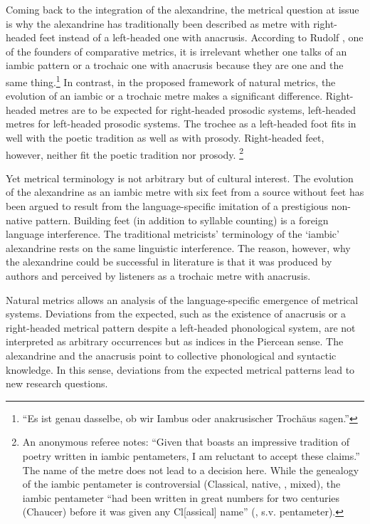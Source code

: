 \documentclass[output=paper
  ,nobabel
  ,uniformtopskip %
]{langscibook}
\begin{document}
Coming back to the integration of the  alexandrine, the metrical question at issue is why the  alexandrine has traditionally been described as metre with right-headed feet instead of a left-headed one with anacrusis. According to Rudolf \citet[154]{Westphal1892}, one of the founders of comparative metrics, it is irrelevant whether one talks of an iambic pattern or a trochaic one with anacrusis because they are one and the same thing.\footnote{
\hspace{1pt}``Es ist genau dasselbe, ob wir Iambus oder anakrusischer Trochäus sagen.''} In contrast, in the proposed framework of natural metrics, the evolution of an iambic or a trochaic metre makes a significant difference. Right-headed metres are to be expected for right-headed prosodic systems, left-headed metres for left-headed prosodic systems. The trochee as a left-headed foot fits in well with the  poetic tradition as well as with  prosody. Right-headed feet, however, neither fit the  poetic tradition nor  prosody.%
%
\footnote{An anonymous referee notes: ``Given that  boasts an impressive tradition of poetry written in iambic pentameters, I am reluctant to accept these claims.'' The name of the  metre does not lead to a decision here. While the genealogy of the  iambic pentameter is controversial (Classical, native, , mixed), the  iambic pentameter ``had been written in great numbers for two centuries (Chaucer) before it was given any Cl[assical] name'' (\citealt{Encyclopedia1993}, s.v. pentameter).} 

Yet metrical terminology is not arbitrary but of cultural interest. The evolution of the  alexandrine as an iambic metre with six feet from a  source without feet has been argued to result from the language-specific imitation of a prestigious non-native pattern. Building feet (in addition to syllable counting) is a foreign language interference. The traditional metricists' terminology of the `iambic' alexandrine rests on the same linguistic interference. The reason, however, why the alexandrine could be successful in  literature is that it was produced by  authors and perceived by  listeners as a trochaic metre with anacrusis.

Natural metrics allows an analysis of the language-specific emergence of metrical systems. Deviations from the expected, such as the existence of anacrusis or a right-headed metrical pattern despite a left-headed phonological system, are not interpreted as arbitrary occurrences but as indices in the Piercean sense. The  alexandrine and the  anacrusis point to collective phonological and syntactic knowledge. In this sense, deviations from the expected metrical patterns lead to new research questions.
\end{document}
